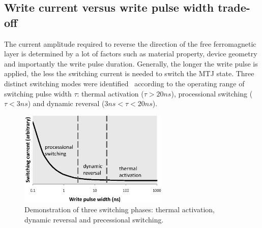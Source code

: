 \subsection{Write current versus write pulse width trade-off} \label{subsec:ict}
The current amplitude required to reverse the direction of the free ferromagnetic layer is determined by a lot of factors such as material property, device geometry and importantly the write pulse duration. Generally, the longer the write pulse is applied, the less the switching current is needed to switch the MTJ state. Three distinct switching modes were identified~\cite{STTRAM:JAP07} according to the operating range of switching pulse width $\tau$: thermal activation ($\tau>20ns$), processional switching ($\tau<3ns$) and dynamic reversal ($3ns<\tau<20ns$).

\begin{figure}[t]
  \centering
  \includegraphics[width=2.8in]{fig/IcWt.eps}
  \caption{Demonstration of three switching phases: thermal activation, dynamic reversal and precessional switching.}
  \label{fig:IcWt}
\end{figure}

